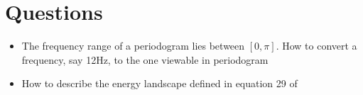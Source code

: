 \documentclass{article}
\begin{document}
\section{Questions}
\begin{itemize}
  \item The frequency range of a periodogram lies between $[0, \pi]$.  How to convert a frequency, say 12Hz, to the one viewable in periodogram 
  \item How to describe the energy landscape defined in equation 29 of~\cite{lavielle2005using}
\end{itemize}



\end{document}
